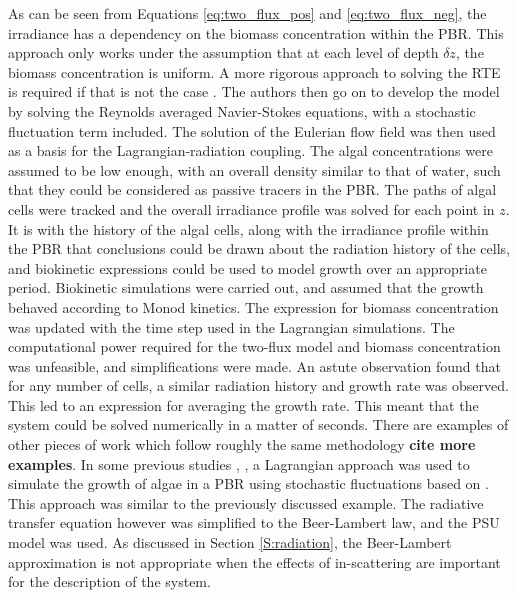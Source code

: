 As can be seen from Equations \ref{eq:two_flux_pos} and \ref{eq:two_flux_neg}, the irradiance has a dependency on the biomass concentration within the PBR. This approach only works under the assumption that at each level of depth $\delta z$, the biomass concentration is uniform. A more rigorous approach to solving the RTE is required if that is not the case \cite{Pruvost2008}. The authors then go on to develop the model by solving the Reynolds averaged Navier-Stokes equations, with a stochastic fluctuation term included. The solution of the Eulerian flow field was then used as a basis for the Lagrangian-radiation coupling. The algal concentrations were assumed to be low enough, with an overall density similar to that of water, such that they could be considered as passive tracers in the PBR. The paths of algal cells were tracked and the overall irradiance profile was solved for each point in $z$. It is with the history of the algal cells, along with the irradiance profile within the PBR that conclusions could be drawn about the radiation history of the cells, and biokinetic expressions could be used to model growth over an appropriate period. Biokinetic simulations were carried out, and assumed that the growth behaved according to Monod kinetics. The expression for biomass concentration was updated with the time step used in the Lagrangian simulations. The computational power required for the two-flux model and biomass concentration was unfeasible, and simplifications were made. An astute observation found that for any number of cells, a similar radiation history and growth rate was observed. This led to an expression for averaging the growth rate. This meant that the system could be solved numerically in a matter of seconds. There are examples of other pieces of work which follow roughly the same methodology \cite{Marshall2011} \textbf{cite more examples}. In some previous studies \cite{Marshall2011}, \cite{Marschall2012}, a Lagrangian approach was used to simulate the growth of algae in a PBR using stochastic fluctuations based on \cite{Thomson1987}. This approach was similar to the previously discussed example. The radiative transfer equation however was simplified to the Beer-Lambert law, and the PSU model \cite{Eilers1988} was used. As discussed in Section \ref{S:radiation}, the Beer-Lambert approximation is not appropriate when the effects of in-scattering are important for the description of the system. 


